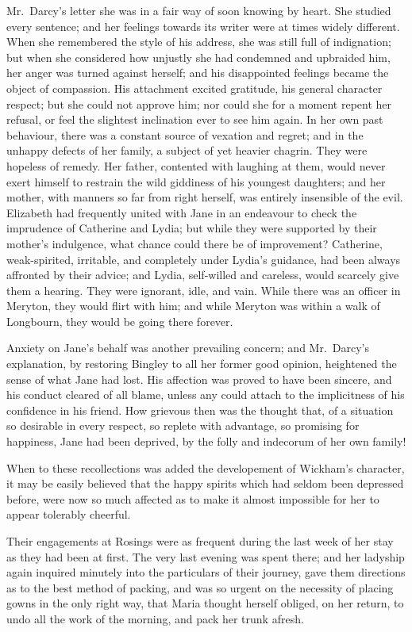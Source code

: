 \documentclass[12pt,english]{book}
\begin{document}
Mr.\ Darcy's letter she was in a fair way of soon knowing by heart.
She studied every sentence; and her feelings towards its writer were
at times widely different. When she remembered the style of his address,
she was still full of indignation; but when she considered how unjustly
she had condemned and upbraided him, her anger was turned against
herself; and his disappointed feelings became the object of compassion.
His attachment excited gratitude, his general character respect; but
she could not approve him; nor could she for a moment repent her refusal,
or feel the slightest inclination ever to see him again. In her own
past behaviour, there was a constant source of vexation and regret;
and in the unhappy defects of her family, a subject of yet heavier
chagrin. They were hopeless of remedy. Her father, contented with
laughing at them, would never exert himself to restrain the wild giddiness
of his youngest daughters; and her mother, with manners so far from
right herself, was entirely insensible of the evil. Elizabeth had
frequently united with Jane in an endeavour to check the imprudence
of Catherine and Lydia; but while they were supported by their mother's
indulgence, what chance could there be of improvement? Catherine,
weak-spirited, irritable, and completely under Lydia's guidance, had
been always affronted by their advice; and Lydia, self-willed and
careless, would scarcely give them a hearing. They were ignorant,
idle, and vain. While there was an officer in Meryton, they would
flirt with him; and while Meryton was within a walk of Longbourn,
they would be going there forever.

Anxiety on Jane's behalf was another prevailing concern; and Mr.\ Darcy's
explanation, by restoring Bingley to all her former good opinion,
heightened the sense of what Jane had lost. His affection was proved
to have been sincere, and his conduct cleared of all blame, unless
any could attach to the implicitness of his confidence in his friend.
How grievous then was the thought that, of a situation so desirable
in every respect, so replete with advantage, so promising for happiness,
Jane had been deprived, by the folly and indecorum of her own family!

When to these recollections was added the developement of Wickham's
character, it may be easily believed that the happy spirits which
had seldom been depressed before, were now so much affected as to
make it almost impossible for her to appear tolerably cheerful.

Their engagements at Rosings were as frequent during the last week
of her stay as they had been at first. The very last evening was spent
there; and her ladyship again inquired minutely into the particulars
of their journey, gave them directions as to the best method of packing,
and was so urgent on the necessity of placing gowns in the only right
way, that Maria thought herself obliged, on her return, to undo all
the work of the morning, and pack her trunk afresh.
\end{document}
